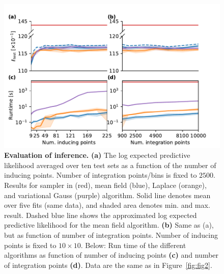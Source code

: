 \documentclass[twoside,11pt]{article}
\begin{document}
\begin{figure}
\centering
\includegraphics[width=.9\textwidth]{figures/fig3.pdf}
\caption{{\bf Evaluation of inference.} {\bf (a)} The log expected predictive likelihood averaged over ten test sets as a function of the number of inducing points. Number of integration points/bins is fixed to $2500$. Results for sampler in (red), mean field (blue), Laplace (orange), and variational Gauss (purple) algorithm. Solid line denotes mean over five fits (same data), and shaded area denotes min. and max. result. Dashed blue line shows the approximated log expected predictive likelihood for the mean field algorithm. {\bf (b)} Same as (a), but as function of number of integration points. Number of inducing points is fixed to $10\times10$. Below: Run time of the different algorithms as function of number of inducing points {\bf (c)} and number of integration points {\bf (d)}. Data are the same as in Figure~\ref{fig:fig2}.}
\label{fig:fig3}
\end{figure}
\end{document}
